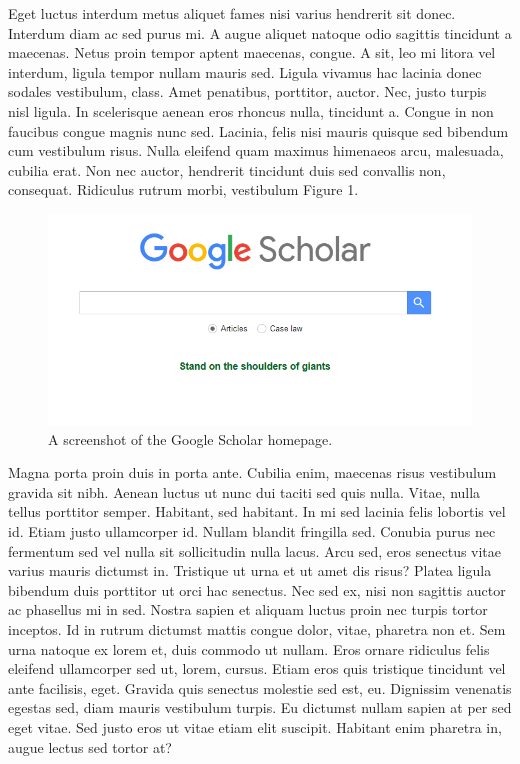 \documentclass[
  12,
]{article}
\begin{document}
Eget luctus interdum metus aliquet fames nisi varius hendrerit sit
donec. Interdum diam ac sed purus mi. A augue aliquet natoque odio
sagittis tincidunt a maecenas. Netus proin tempor aptent maecenas,
congue. A sit, leo mi litora vel interdum, ligula tempor nullam mauris
sed. Ligula vivamus hac lacinia donec sodales vestibulum, class. Amet
penatibus, porttitor, auctor. Nec, justo turpis nisl ligula. In
scelerisque aenean eros rhoncus nulla, tincidunt a. Congue in non
faucibus congue magnis nunc sed. Lacinia, felis nisi mauris quisque sed
bibendum cum vestibulum risus. Nulla eleifend quam maximus himenaeos
arcu, malesuada, cubilia erat. Non nec auctor, hendrerit tincidunt duis
sed convallis non, consequat. Ridiculus rutrum morbi, vestibulum Figure
1.

\begin{figure}

{\centering \includegraphics[width=0.6\linewidth]{../image/google_scholar} 

}

\caption{A screenshot of the Google Scholar homepage. \label{g_scholar}}\label{fig:screenshot}
\end{figure}

Magna porta proin duis in porta ante. Cubilia enim, maecenas risus
vestibulum gravida sit nibh. Aenean luctus ut nunc dui taciti sed quis
nulla. Vitae, nulla tellus porttitor semper. Habitant, sed habitant. In
mi sed lacinia felis lobortis vel id. Etiam justo ullamcorper id. Nullam
blandit fringilla sed. Conubia purus nec fermentum sed vel nulla sit
sollicitudin nulla lacus. Arcu sed, eros senectus vitae varius mauris
dictumst in. Tristique ut urna et ut amet dis risus? Platea ligula
bibendum duis porttitor ut orci hac senectus. Nec sed ex, nisi non
sagittis auctor ac phasellus mi in sed. Nostra sapien et aliquam luctus
proin nec turpis tortor inceptos. Id in rutrum dictumst mattis congue
dolor, vitae, pharetra non et. Sem urna natoque ex lorem et, duis
commodo ut nullam. Eros ornare ridiculus felis eleifend ullamcorper sed
ut, lorem, cursus. Etiam eros quis tristique tincidunt vel ante
facilisis, eget. Gravida quis senectus molestie sed est, eu. Dignissim
venenatis egestas sed, diam mauris vestibulum turpis. Eu dictumst nullam
sapien at per sed eget vitae. Sed justo eros ut vitae etiam elit
suscipit. Habitant enim pharetra in, augue lectus sed tortor at?
\end{document}
